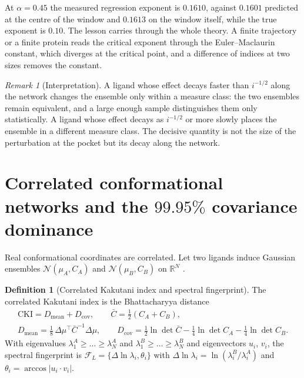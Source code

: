 \documentclass[11pt,reqno]{amsart}
\theoremstyle{plain}
\theoremstyle{definition}
\newtheorem{definition}[theorem]{Definition}
\theoremstyle{remark}
\newtheorem{remark}[theorem]{Remark}
\numberwithin{equation}{section}
\newcommand{\Rr}{\mathbb{R}}
\newcommand{\CKI}{\mathrm{CKI}}
\begin{document}
At $\alpha=0.45$ the measured regression exponent is $0.1610$, against $0.1601$ predicted at the centre of the window and $0.1613$ on the window itself, while the true exponent is $0.10$. The lesson carries through the whole theory. A finite trajectory or a finite protein reads the critical exponent through the Euler--Maclaurin constant, which diverges at the critical point, and a difference of indices at two sizes removes the constant.

\begin{remark}[Interpretation]
A ligand whose effect decays faster than $i^{-1/2}$ along the network changes the ensemble only within a measure class: the two ensembles remain equivalent, and a large enough sample distinguishes them only statistically. A ligand whose effect decays as $i^{-1/2}$ or more slowly places the ensemble in a different measure class. The decisive quantity is not the size of the perturbation at the pocket but its decay along the network.
\end{remark}

\section{Correlated conformational networks and the \texorpdfstring{$99.95\%$}{99.95\%} covariance dominance}
\label{sec:cki}

Real conformational coordinates are correlated. Let two ligands induce Gaussian ensembles $\mathcal N(\mu_A,C_A)$ and $\mathcal N(\mu_B,C_B)$ on $\Rr^N$ \cite{ChenChen2026II}.

\begin{definition}[Correlated Kakutani index and spectral fingerprint]\label{def:cki}
The correlated Kakutani index is the Bhattacharyya distance \cite{Bhattacharyya1943}
\begin{equation}\label{eq:cki}
\begin{gathered}
\CKI=D_{\mathrm{mean}}+D_{\mathrm{cov}},\qquad \bar C=\tfrac12(C_A+C_B),\\
D_{\mathrm{mean}}=\tfrac18\,\Delta\mu^{\top}\bar C^{-1}\Delta\mu,\qquad D_{\mathrm{cov}}=\tfrac12\ln\det\bar C-\tfrac14\ln\det C_A-\tfrac14\ln\det C_B .
\end{gathered}
\end{equation}
With eigenvalues $\lambda^A_1\ge\dots\ge\lambda^A_N$ and $\lambda^B_1\ge\dots\ge\lambda^B_N$ and eigenvectors $u_i$, $v_i$, the spectral fingerprint is $\mathcal F_L=\{\Delta\ln\lambda_i,\theta_i\}$ with $\Delta\ln\lambda_i=\ln(\lambda^B_i/\lambda^A_i)$ and $\theta_i=\arccos|u_i\cdot v_i|$.
\end{definition}
\end{document}
